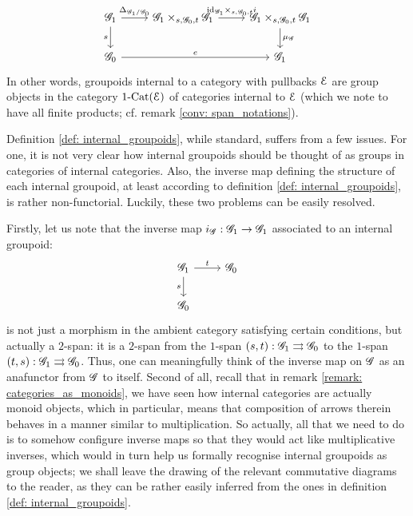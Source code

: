 \begin{definition}
$$                    $$
                    $$
                        \begin{tikzcd}
                        	{\scrG_1} & {\scrG_1 \x_{s, \scrG_0, t} \scrG_1} & {\scrG_1 \x_{s, \scrG_0, t} \scrG_1} \\
                        	{\scrG_0} && {\scrG_1}
                        	\arrow["{\mu_{\scrG}}", from=1-3, to=2-3]
                        	\arrow["{\id_{\scrG_1} \x_{s, \scrG_0, t} i}", from=1-2, to=1-3]
                        	\arrow["{\Delta_{\scrG_1/\scrG_0}}", from=1-1, to=1-2]
                        	\arrow["s"', from=1-1, to=2-1]
                        	\arrow["e", from=2-1, to=2-3]
                        \end{tikzcd}
                    $$
                In other words, groupoids internal to a category with pullbacks $\mathcal{E}$ are group objects in the category $1\text{-}\mathrm{Cat}(\mathcal{E})$ of categories internal to $\mathcal{E}$ (which we note to have all finite products; cf. remark \ref{conv: span_notations}).
            \end{definition}
            \begin{remark}
                Definition \ref{def: internal_groupoids}, while standard, suffers from a few issues. For one, it is not very clear how internal groupoids should be thought of as groups in categories of internal categories. Also, the inverse map defining the structure of each internal groupoid, at least according to definition \ref{def: internal_groupoids}, is rather non-functorial. Luckily, these two problems can be easily resolved. 
                
                Firstly, let us note that the inverse map $i_{\mathscr{G}}: \mathscr{G}_1 \to \mathscr{G}_1$ associated to an internal groupoid:
                    $$
                        \begin{tikzcd}
                        	{\scrG_1} & {\scrG_0} \\
                        	{\scrG_0}
                        	\arrow["s"', from=1-1, to=2-1]
                        	\arrow["t", from=1-1, to=1-2]
                        \end{tikzcd}
                    $$
                is not just a morphism in the ambient category satisfying certain conditions, but actually a $2$-span: it is a $2$-span from the $1$-span $(s,t): \mathscr{G}_1 \rightrightarrows \mathscr{G}_0$ to the $1$-span $(t,s): \mathscr{G}_1 \rightrightarrows \mathscr{G}_0$. Thus, one can meaningfully think of the inverse map on $\mathscr{G}$ as an anafunctor from $\mathscr{G}$ to itself. Second of all, recall that in remark \ref{remark: categories_as_monoids}, we have seen how internal categories are actually monoid objects, which in particular, means that composition of arrows therein behaves in a manner similar to multiplication. So actually, all that we need to do is to somehow configure inverse maps so that they would act like multiplicative inverses, which would in turn help us formally recognise internal groupoids as group objects; we shall leave the drawing of the relevant commutative diagrams to the reader, as they can be rather easily inferred from the ones in definition \ref{def: internal_groupoids}. 
            \end{remark}
        
